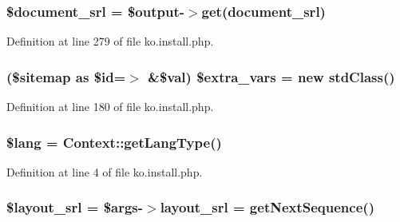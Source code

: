 \subsubsection[{\texorpdfstring{\$document\+\_\+srl}{$document_srl}}]{\setlength{\rightskip}{0pt plus 5cm}\$document\+\_\+srl = \$output-\/$>$get(\textquotesingle{}document\+\_\+srl\textquotesingle{})}\hypertarget{ko_8install_8php_a14522e7fff0604a8372c75b4a0fbc0fd}{}\label{ko_8install_8php_a14522e7fff0604a8372c75b4a0fbc0fd}


Definition at line 279 of file ko.\+install.\+php.

\subsubsection[{\texorpdfstring{\$extra\+\_\+vars}{$extra_vars}}]{ (\$sitemap as \${\bf id}=$>$ \&\${\bf val}) \${\bf extra\+\_\+vars} = new std\+Class()}\hypertarget{ko_8install_8php_a99863a9d4b597491e1a9c801f2e55c0b}{}\label{ko_8install_8php_a99863a9d4b597491e1a9c801f2e55c0b}


Definition at line 180 of file ko.\+install.\+php.

\subsubsection[{\texorpdfstring{\$lang}{$lang}}]{\setlength{\rightskip}{0pt plus 5cm}\${\bf lang} = {\bf Context\+::get\+Lang\+Type}()}\hypertarget{ko_8install_8php_a7714b111b644017933931ec69a154102}{}\label{ko_8install_8php_a7714b111b644017933931ec69a154102}


Definition at line 4 of file ko.\+install.\+php.

\subsubsection[{\texorpdfstring{\$layout\+\_\+srl}{$layout_srl}}]{\setlength{\rightskip}{0pt plus 5cm}\${\bf layout\+\_\+srl} = \$args-\/$>${\bf layout\+\_\+srl} = {\bf get\+Next\+Sequence}()}\hypertarget{ko_8install_8php_a77889723c4aa360089caae223118d413}{}\label{ko_8install_8php_a77889723c4aa360089caae223118d413}


